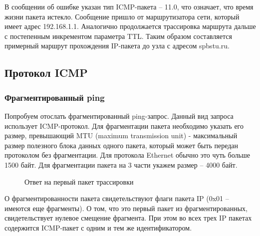 \documentclass[a4paper, 14pt,russian]{article}
\begin{document}
	В сообщении об ошибке указан тип ICMP-пакета – 11.0, что означает, что время жизни пакета истекло. Сообщение пришло от маршрутизатора сети, который имеет адрес 192.168.1.1. 
	Аналогично продолжается трассировка маршрута дальше с постепенным инкрементом параметра TTL. Таким образом составляется примерный маршрут прохождения IP-пакета до узла с адресом spbstu.ru.

\subsection{Протокол ICMP}
	\subsubsection{Фрагментированный ping}
		Попробуем отослать фрагментированный ping-запрос. Данный вид запроса использует ICMP-протокол. Для фрагментации пакета необходимо указать его размер, превышающий MTU (maximum transmission unit) - максимальный размер полезного блока данных одного пакета, который может быть передан протоколом без фрагментации. Для протокола Ethernet обычно это чуть больше 1500 байт. Для фрагментации пакета на 3 части укажем размер – 4000 байт.
		
		\begin{figure}[h!]
			\caption{Ответ на первый пакет трассировки}
			\label{img:frag_ping}
		\end{figure}
	
		О фрагментированности пакета свидетельствуют флаги пакета IP (0x01 – имеются еще фрагменты). О том, что это первый пакет из фрагментированных, свидетельствует нулевое смещение фрагмента. При этом во всех трех IP пакетах содержится ICMP-пакет с одним и тем же идентификатором.
	
\end{document}
